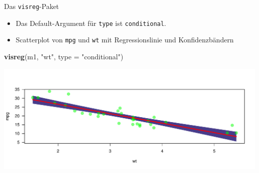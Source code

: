 \documentclass[ignorenonframetext,]{beamer}
\newenvironment{Shaded}{\begin{snugshade}}{\end{snugshade}}
\newcommand{\DataTypeTok}[1]{\textcolor[rgb]{0.13,0.29,0.53}{#1}}
\newcommand{\KeywordTok}[1]{\textcolor[rgb]{0.13,0.29,0.53}{\textbf{#1}}}
\newcommand{\NormalTok}[1]{#1}
\newcommand{\StringTok}[1]{\textcolor[rgb]{0.31,0.60,0.02}{#1}}
\providecommand{\tightlist}{%
  \setlength{\itemsep}{0pt}\setlength{\parskip}{0pt}}
\begin{document}
\begin{frame}[fragile]{Das \texttt{visreg}-Paket}
\protect\hypertarget{das-visreg-paket-1}{}

\begin{itemize}
\tightlist
\item
  Das Default-Argument für \texttt{type} ist \texttt{conditional}.
\item
  Scatterplot von \texttt{mpg} und \texttt{wt} mit Regressionslinie und
  Konfidenzbändern
\end{itemize}

\begin{Shaded}
\begin{Highlighting}[]
\KeywordTok{visreg}\NormalTok{(m1, }\StringTok{"wt"}\NormalTok{, }\DataTypeTok{type =} \StringTok{"conditional"}\NormalTok{)}
\end{Highlighting}
\end{Shaded}

\includegraphics{B3_linreg_files/figure-beamer/unnamed-chunk-30-1.pdf}

\end{frame}
\end{document}
